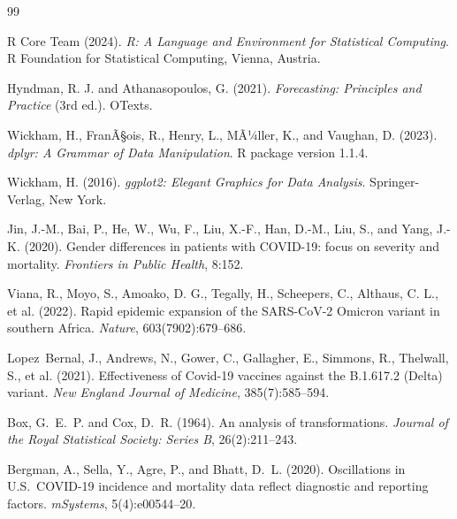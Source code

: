 ﻿\documentclass[12pt,a4paper]{article}
\begin{document}
\begin{thebibliography}{99}

R Core Team (2024).
\newblock \emph{R: A Language and Environment for Statistical Computing}.
\newblock R Foundation for Statistical Computing, Vienna, Austria.

Hyndman, R. J. and Athanasopoulos, G. (2021).
\newblock \emph{Forecasting: Principles and Practice} (3rd ed.).
\newblock OTexts.

Wickham, H., FranÃ§ois, R., Henry, L., MÃ¼ller, K., and Vaughan, D. (2023).
\newblock \emph{dplyr: A Grammar of Data Manipulation}.
\newblock R package version 1.1.4.

Wickham, H. (2016).
\newblock \emph{ggplot2: Elegant Graphics for Data Analysis}.
\newblock Springer-Verlag, New York.

Jin, J.-M., Bai, P., He, W., Wu, F., Liu, X.-F., Han, D.-M., Liu, S., and Yang, J.-K. (2020).
\newblock Gender differences in patients with COVID-19: focus on severity and mortality.
\newblock \emph{Frontiers in Public Health}, 8:152.

Viana, R., Moyo, S., Amoako, D. G., Tegally, H., Scheepers, C., Althaus, C. L., et al. (2022).
\newblock Rapid epidemic expansion of the SARS-CoV-2 Omicron variant in southern Africa.
\newblock \emph{Nature}, 603(7902):679--686.

Lopez~Bernal, J., Andrews, N., Gower, C., Gallagher, E., Simmons, R., Thelwall, S., et al. (2021).
\newblock Effectiveness of Covid-19 vaccines against the B.1.617.2 (Delta) variant.
\newblock \emph{New England Journal of Medicine}, 385(7):585--594.

Box, G.~E.~P. and Cox, D.~R. (1964).
\newblock An analysis of transformations.
\newblock \emph{Journal of the Royal Statistical Society: Series B}, 26(2):211--243.

Bergman, A., Sella, Y., Agre, P., and Bhatt, D.~L. (2020).
\newblock Oscillations in U.S.~COVID-19 incidence and mortality data reflect diagnostic and reporting factors.
\newblock \emph{mSystems}, 5(4):e00544--20.

\end{thebibliography}
\end{document}
